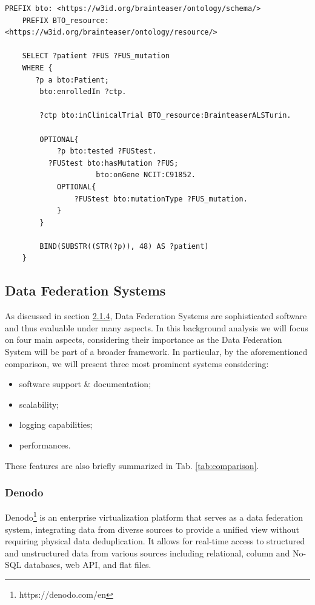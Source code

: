 \begin{lstlisting}[language=SPARQL, caption={Example of a \ac{SPARQL} query for genetic markers data.}, label={lst:sparql-query}]
    PREFIX bto: <https://w3id.org/brainteaser/ontology/schema/>
    PREFIX BTO_resource: <https://w3id.org/brainteaser/ontology/resource/>
    
    SELECT ?patient ?FUS ?FUS_mutation
    WHERE { 
       ?p a bto:Patient;
        bto:enrolledIn ?ctp.
        
        ?ctp bto:inClinicalTrial BTO_resource:BrainteaserALSTurin.
        
        OPTIONAL{
            ?p bto:tested ?FUStest.
          ?FUStest bto:hasMutation ?FUS;
                     bto:onGene NCIT:C91852.
            OPTIONAL{
                ?FUStest bto:mutationType ?FUS_mutation.
            }
        }
         
        BIND(SUBSTR((STR(?p)), 48) AS ?patient)
    }
\end{lstlisting}


\subsection{Data Federation Systems}
As discussed in section \hyperref[DF]{2.1.4}, Data Federation Systems are sophisticated software and thus evaluable under many aspects. In this background analysis we will focus on four main aspects, considering their importance as the Data Federation System will be part of a broader framework. In particular, by the aforementioned comparison, we will present three most prominent systems considering:
\begin{itemize}
    \item software support \& documentation;
    \item scalability;
    \item logging capabilities;
    \item performances.
\end{itemize}

These features are also briefly summarized in Tab. \ref{tab:comparison}.

\subsubsection{Denodo}
Denodo\footnote{https://denodo.com/en} is an enterprise virtualization platform that serves as a data federation system, integrating data from diverse sources to provide a unified view without requiring physical data deduplication. It allows for real-time access to structured and unstructured data from various sources including relational, column and No-SQL databases, web \ac{API}, and flat files.

